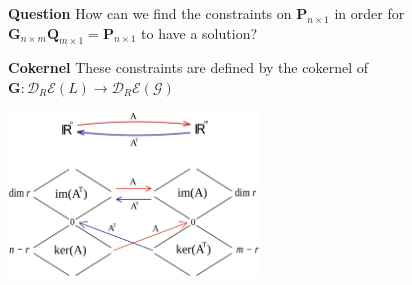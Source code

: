 \begin{frame}
\begin{block}{\textbf{Question}}
How can we find the constraints on $\mathbf{P}_{n \times 1}$ in order for $\mathbf{G}_{n \times m} \mathbf{Q}_{m \times 1} = \mathbf{P}_{n \times 1}$ to have a solution?
\end{block}
\begin{block}{\textbf{Cokernel}}
These constraints are defined by the cokernel of $\mathbf{G} \colon \mathcal{D}_R\mathcal{E}(L) \rightarrow \mathcal{D}_R\mathcal{E}(\mathcal{G})$
\begin{center}
\includegraphics[width=0.5\textwidth]{fig/fundamental_subspaces.pdf}
\end{center}
\end{block}
\end{frame}

